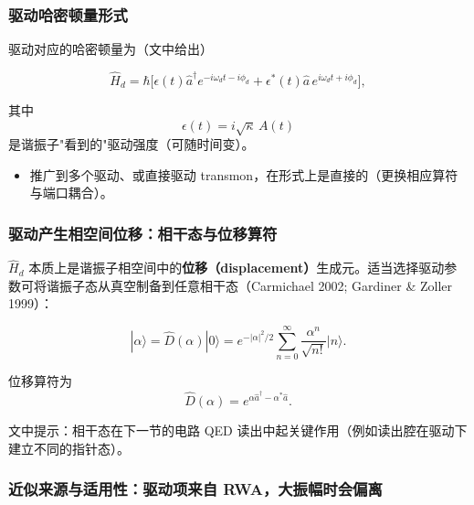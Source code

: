 \documentclass[12pt,a4paper,oneside]{ctexbook}
\begin{document}
\subsubsection{驱动哈密顿量形式}

驱动对应的哈密顿量为（文中给出）

\begin{equation}
\hat H_d=\hbar\Big[\epsilon(t)\hat a^\dagger e^{-i\omega_d t-i\phi_d}
+\epsilon^*(t)\hat a\, e^{i\omega_d t+i\phi_d}\Big],
\tag{84}
\end{equation}

其中
\begin{equation}
\epsilon(t)= i\sqrt{\kappa}\,A(t)
\end{equation}
是谐振子"看到的"驱动强度（可随时间变）。

\begin{itemize}
  \item 推广到多个驱动、或直接驱动 transmon，在形式上是直接的（更换相应算符与端口耦合）。
\end{itemize}

\subsubsection{驱动产生相空间位移：相干态与位移算符}

$\hat H_d$ 本质上是谐振子相空间中的\textbf{位移（displacement）}生成元。适当选择驱动参数可将谐振子态从真空制备到任意相干态（Carmichael 2002; Gardiner \& Zoller 1999）：

\begin{equation}
|\alpha\rangle=\hat D(\alpha)|0\rangle
= e^{-|\alpha|^2/2}\sum_{n=0}^\infty \frac{\alpha^n}{\sqrt{n!}}|n\rangle.
\tag{85}
\end{equation}

位移算符为
\begin{equation}
\hat D(\alpha)=e^{\alpha \hat a^\dagger-\alpha^*\hat a}.
\tag{86}
\end{equation}

文中提示：相干态在下一节的电路 QED 读出中起关键作用（例如读出腔在驱动下建立不同的指针态）。

\subsubsection{近似来源与适用性：驱动项来自 RWA，大振幅时会偏离}
\end{document}
